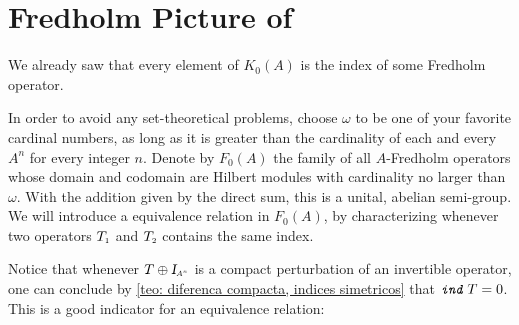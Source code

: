 
\section[Fredholm Picture of \texorpdfstring{\ensuremath{K_0(A)}}{K0(A)}]{Fredholm Picture of \texorpdfstring{}{K0(A)}}

We already saw that every element of $K_0(A)$ is the index of some Fredholm operator.

In order to avoid any set-theoretical problems, choose $\omega$ to be one of your favorite cardinal numbers, as long as it is greater than the cardinality of each and every $A^n$ for every integer $n$. Denote by $F_0(A)$ the family of all $A$-Fredholm operators whose domain and codomain are Hilbert modules with cardinality no larger than $\omega$. With the addition given by the direct sum, this is a unital, abelian semi-group. We will introduce a equivalence relation in $F_0(A)$, by characterizing whenever two operators $\sub{T}{1}$ and $\sub{T}{2}$ contains the same index.

Notice that whenever $T \oplus \sub\Id{A^n}$ is a compact perturbation of an invertible operator, one can conclude by \ref{teo: diferenca compacta, indices simetricos} that $\texttt{\textit{ind}}\, T = 0$. This is a good indicator for an equivalence relation:

